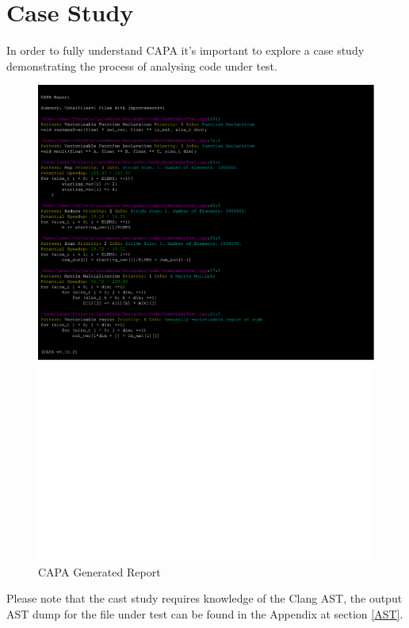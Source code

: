 
\section{Case Study} %
In order to fully understand CAPA it's important to explore a case study demonstrating the process
of analysing code under test.

\begin{figure}[H]
\includegraphics[clip, trim=0cm 12.7cm 6cm 0.5cm, width=\textwidth]{./Misc/report.pdf}
\caption{CAPA Generated Report}
\end{figure}
Please note that the cast study requires knowledge of the Clang AST, the output AST dump for the file
under test can be found in the Appendix at section \ref{AST}.


